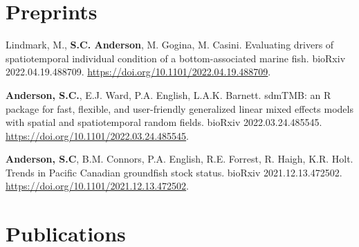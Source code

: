 \hypertarget{preprints}{%
\section{Preprints}\label{preprints}}

\begin{description}
\tightlist
\item[2022]
Lindmark, M., \textbf{S.C. Anderson}, M. Gogina, M. Casini. Evaluating
drivers of spatiotemporal individual condition of a bottom-associated
marine fish. bioRxiv 2022.04.19.488709.
\url{https://doi.org/10.1101/2022.04.19.488709}.
\item[2022]
\textbf{Anderson, S.C.}, E.J. Ward, P.A. English, L.A.K. Barnett.
sdmTMB: an R package for fast, flexible, and user-friendly generalized
linear mixed effects models with spatial and spatiotemporal random
fields. bioRxiv 2022.03.24.485545.
\url{https://doi.org/10.1101/2022.03.24.485545}.
\item[2021]
\textbf{Anderson, S.C}, B.M. Connors, P.A. English, R.E. Forrest, R.
Haigh, K.R. Holt. Trends in Pacific Canadian groundfish stock status.
bioRxiv 2021.12.13.472502.
\url{https://doi.org/10.1101/2021.12.13.472502}.
\end{description}

\hypertarget{publications}{%
\section{Publications}\label{publications}}

